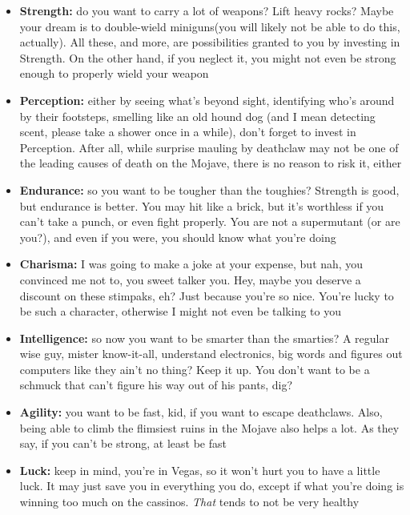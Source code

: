 \documentclass[11pt]{article} %
\begin{document}
\begin{itemize}
	\item \textbf{Strength:} do you want to carry a lot of weapons? Lift heavy rocks? Maybe your dream is to double-wield miniguns(you will likely not be able to do this, actually). All these, and more, are possibilities granted to you by investing in Strength. On the other hand, if you neglect it, you might not even be strong enough to properly wield your weapon
	
	\item \textbf{Perception:} either by seeing what's beyond sight, identifying who's around by their footsteps, smelling like an old hound dog (and I mean detecting scent, please take a shower once in a while), don't forget to invest in Perception. After all, while surprise mauling by deathclaw may not be one of the leading causes of death on the Mojave, there is no reason to risk it, either
	
	\item \textbf{Endurance:} so you want to be tougher than the toughies? Strength is good, but endurance is better. You may hit like a brick, but it's worthless if you can't take a punch, or even fight properly. You are not a supermutant (or are you?), and even if you were, you should know what you're doing
	
	\item \textbf{Charisma:} I was going to make a joke at your expense, but nah, you convinced me not to, you sweet talker you. Hey, maybe you deserve a discount on these stimpaks, eh? Just because you're so nice. You're lucky to be such a character, otherwise I might not even be talking to you
	
	\item \textbf{Intelligence:} so now you want to be smarter than the smarties? A regular wise guy, mister know-it-all, understand electronics, big words and figures out computers like they ain't no thing? Keep it up. You don't want to be a schmuck that can't figure his way out of his pants, dig?
	
	\item \textbf{Agility:} you want to be fast, kid, if you want to escape deathclaws. Also, being able to climb the flimsiest ruins in the Mojave also helps a lot. As they say, if you can't be strong, at least be fast
	
	\item \textbf{Luck:} keep in mind, you're in Vegas, so it won't hurt you to have a little luck. It may just save you in everything you do, except if what you're doing is winning too much on the cassinos. \textit{That} tends to not be very healthy
\end{itemize}
\end{document}
